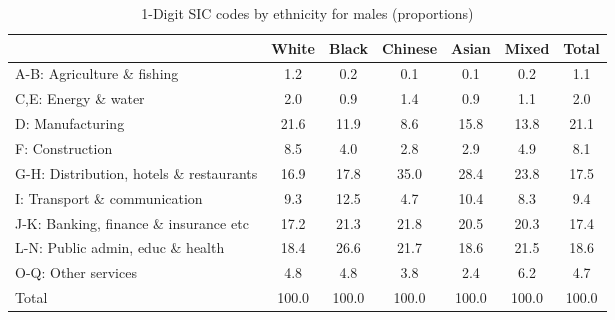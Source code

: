 \begin{table}[htbp]\centering
\def\sym#1{\ifmmode^{#1}\else\(^{#1}\)\fi}
\caption{1-Digit SIC codes by ethnicity for males (proportions)}
\begin{tabular}{l*{6}{c}}
\hline\hline
          &    White&    Black&  Chinese&    Asian&    Mixed&    Total\\
\hline
A-B: Agriculture \& fishing&      1.2&      0.2&      0.1&      0.1&      0.2&      1.1\\
C,E: Energy \& water&      2.0&      0.9&      1.4&      0.9&      1.1&      2.0\\
D: Manufacturing&     21.6&     11.9&      8.6&     15.8&     13.8&     21.1\\
F: Construction&      8.5&      4.0&      2.8&      2.9&      4.9&      8.1\\
G-H: Distribution, hotels \& restaurants&     16.9&     17.8&     35.0&     28.4&     23.8&     17.5\\
I: Transport \& communication&      9.3&     12.5&      4.7&     10.4&      8.3&      9.4\\
J-K: Banking, finance \& insurance etc&     17.2&     21.3&     21.8&     20.5&     20.3&     17.4\\
L-N: Public admin, educ \& health&     18.4&     26.6&     21.7&     18.6&     21.5&     18.6\\
O-Q: Other services&      4.8&      4.8&      3.8&      2.4&      6.2&      4.7\\
Total     &    100.0&    100.0&    100.0&    100.0&    100.0&    100.0\\
\hline\hline
\end{tabular}
\label{tab:1D_industries_male}
\end{table}
